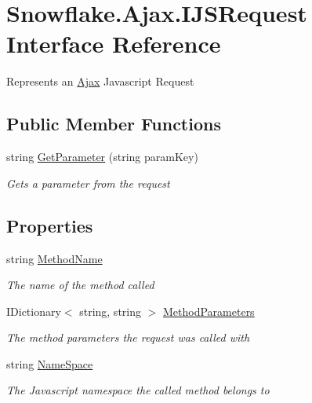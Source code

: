\hypertarget{interface_snowflake_1_1_ajax_1_1_i_j_s_request}{}\section{Snowflake.\+Ajax.\+I\+J\+S\+Request Interface Reference}
\label{interface_snowflake_1_1_ajax_1_1_i_j_s_request}


Represents an \hyperlink{namespace_snowflake_1_1_ajax}{Ajax} Javascript Request  


\subsection*{Public Member Functions}
\begin{DoxyCompactItemize}
\item 
string \hyperlink{interface_snowflake_1_1_ajax_1_1_i_j_s_request_a68284d8affe41bd2f874d50c35718bf8}{Get\+Parameter} (string param\+Key)
\begin{DoxyCompactList}\small\item\em Gets a parameter from the request \end{DoxyCompactList}\end{DoxyCompactItemize}
\subsection*{Properties}
\begin{DoxyCompactItemize}
\item 
string \hyperlink{interface_snowflake_1_1_ajax_1_1_i_j_s_request_a89baf2c0eb864e3129b589a311dd12da}{Method\+Name}
\begin{DoxyCompactList}\small\item\em The name of the method called \end{DoxyCompactList}\item 
I\+Dictionary$<$ string, string $>$ \hyperlink{interface_snowflake_1_1_ajax_1_1_i_j_s_request_a29b4147b39836395032254affd4fba95}{Method\+Parameters}
\begin{DoxyCompactList}\small\item\em The method parameters the request was called with \end{DoxyCompactList}\item 
string \hyperlink{interface_snowflake_1_1_ajax_1_1_i_j_s_request_a0a45d83b00bed741f7c37220ac298bb8}{Name\+Space}
\begin{DoxyCompactList}\small\item\em The Javascript namespace the called method belongs to \end{DoxyCompactList}\end{DoxyCompactItemize}


